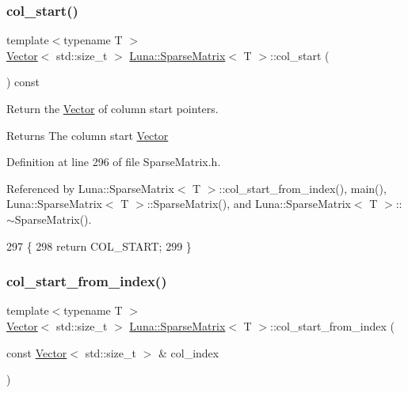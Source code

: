 \subsubsection{\texorpdfstring{col\+\_\+start()}{col\_start()}}
{\footnotesize\ttfamily template$<$typename T $>$ \\
\hyperlink{classLuna_1_1Vector}{Vector}$<$ std\+::size\+\_\+t $>$ \hyperlink{classLuna_1_1SparseMatrix}{Luna\+::\+Sparse\+Matrix}$<$ T $>$\+::col\+\_\+start (\begin{DoxyParamCaption}{ }\end{DoxyParamCaption}) const\hspace{0.3cm}{\ttfamily [inline]}}



Return the \hyperlink{classLuna_1_1Vector}{Vector} of column start pointers. 

\begin{DoxyReturn}{Returns}
The column start \hyperlink{classLuna_1_1Vector}{Vector} 
\end{DoxyReturn}


Definition at line 296 of file Sparse\+Matrix.\+h.



Referenced by Luna\+::\+Sparse\+Matrix$<$ T $>$\+::col\+\_\+start\+\_\+from\+\_\+index(), main(), Luna\+::\+Sparse\+Matrix$<$ T $>$\+::\+Sparse\+Matrix(), and Luna\+::\+Sparse\+Matrix$<$ T $>$\+::$\sim$\+Sparse\+Matrix().


\begin{DoxyCode}
297   \{
298     \textcolor{keywordflow}{return} COL\_START;
299   \}
\end{DoxyCode}
\mbox{\label{classLuna_1_1SparseMatrix_aff245e8e7b0609dd7dc5c2a533c43c87}} 
\subsubsection{\texorpdfstring{col\+\_\+start\+\_\+from\+\_\+index()}{col\_start\_from\_index()}}
{\footnotesize\ttfamily template$<$typename T $>$ \\
\hyperlink{classLuna_1_1Vector}{Vector}$<$ std\+::size\+\_\+t $>$ \hyperlink{classLuna_1_1SparseMatrix}{Luna\+::\+Sparse\+Matrix}$<$ T $>$\+::col\+\_\+start\+\_\+from\+\_\+index (\begin{DoxyParamCaption}\item[{const \hyperlink{classLuna_1_1Vector}{Vector}$<$ std\+::size\+\_\+t $>$ \&}]{col\+\_\+index }\end{DoxyParamCaption})\hspace{0.3cm}{\ttfamily [inline]}}



